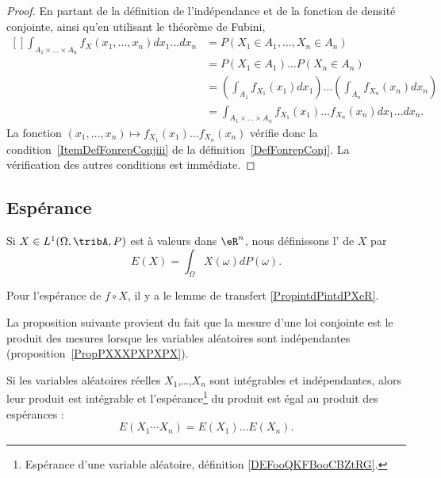 \begin{proof}
	En partant de la définition de l'indépendance et de la fonction de densité conjointe, ainsi qu'en utilisant le théorème de Fubini,
	\begin{equation}
		\begin{aligned}[]
			\int_{A_1\times \ldots\times A_n}f_X(x_1,\ldots,x_n)dx_1\ldots dx_n & =
			P(X_1\in A_1,\ldots,X_n\in A_n)                                                                                                                                 \\
			                                                                    & =P(X_1\in A_1)\ldots P(X_n\in A_n)                                                        \\
			                                                                    & =\left( \int_{A_1}f_{X_1}(x_1)dx_1 \right)\ldots\left( \int_{A_n}f_{X_n}(x_n)dx_n \right) \\
			                                                                    & =\int_{A_1\times\ldots\times A_n}f_{X_1}(x_1)\ldots f_{X_n}(x_n)dx_1\ldots dx_n.
		\end{aligned}
	\end{equation}
	La fonction \( (x_1,\ldots,x_n)\mapsto f_{X_1}(x_1)\ldots f_{X_n}(x_n)\) vérifie donc la condition~\ref{ItemDefFonrepConjiii} de la définition~\ref{DefFonrepConj}. La vérification des autres conditions est immédiate.
\end{proof}


\subsection{Espérance}

\begin{definition}      \label{DEFooQKFBooCBZtRG}
	Si \( X\in L^1(\Omega,\tribA,P)\) est à valeurs dans \( \eR^n\), nous définissons l' de \( X\) par
	\begin{equation}        \label{EqdCBLst}
		E(X)=\int_{\Omega}X(\omega)dP(\omega).
	\end{equation}
\end{definition}

Pour l'espérance de \( f\circ X\), il y a le lemme de transfert \ref{PropintdPintdPXeR}.


La proposition suivante provient du fait que la mesure d'une loi conjointe est le produit des mesures lorsque les variables aléatoires sont indépendantes (proposition~\ref{PropPXXXPXPXPX}).
\begin{proposition}           \label{PROPooDKQDooREiSSf}
	Si les variables aléatoires réelles \( X_1\),\ldots,\( X_n\) sont intégrables et indépendantes, alors leur produit est intégrable et l'espérance\footnote{Espérance d'une variable aléatoire, définition \ref{DEFooQKFBooCBZtRG}.} du produit est égal au produit des espérances :
	\begin{equation}
		E(X_1\cdots X_n)=E(X_1)\ldots E(X_n).
	\end{equation}
\end{proposition}

